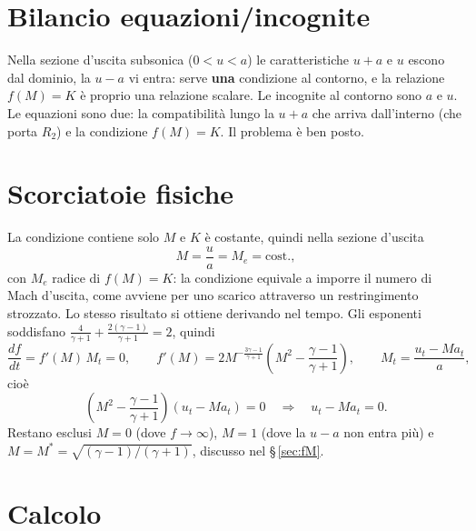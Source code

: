 \documentclass[11pt,a4paper]{article}
\newcommand{\uma}{u-a}
\newcommand{\upa}{u+a}
\newcommand{\Rd}{R_2}
\newcommand{\Me}{M_e}
\newcommand{\Mst}{M^{*}}
\begin{document}
\section{Bilancio equazioni/incognite}
Nella sezione d'uscita subsonica ($0<u<a$) le caratteristiche $\upa$ e $u$ escono dal dominio, la $\uma$ vi
entra: serve \textbf{una} condizione al contorno, e la relazione $f(M)=K$ è proprio una relazione scalare.
Le incognite al contorno sono $a$ e $u$. Le equazioni sono due: la compatibilità lungo la $\upa$ che arriva
dall'interno (che porta $\Rd$) e la condizione $f(M)=K$. Il problema è ben posto.

\section{Scorciatoie fisiche}
La condizione contiene solo $M$ e $K$ è costante, quindi nella sezione d'uscita
\[
  M=\frac ua=\Me=\text{cost.},
\]
con $\Me$ radice di $f(M)=K$: la condizione equivale a imporre il numero di Mach d'uscita, come avviene per
uno scarico attraverso un restringimento strozzato. Lo stesso risultato si ottiene derivando nel tempo. Gli esponenti soddisfano $\frac{4}{\gamma+1}+\frac{2(\gamma-1)}{\gamma+1}=2$,
quindi
\[
  \frac{d f}{dt}=f'(M)\,M_t=0,\qquad
  f'(M)=2M^{-\frac{3\gamma-1}{\gamma+1}}\left(M^2-\frac{\gamma-1}{\gamma+1}\right),\qquad
  M_t=\frac{u_t-M a_t}{a},
\]
cioè
\[
  \left(M^2-\frac{\gamma-1}{\gamma+1}\right)\left(u_t-M a_t\right)=0
  \quad\Rightarrow\quad u_t-M a_t=0 .
\]
Restano esclusi $M=0$ (dove $f\to\infty$), $M=1$ (dove la $\uma$ non entra più) e
$M=\Mst=\sqrt{(\gamma-1)/(\gamma+1)}$, discusso nel \S\,\ref{sec:fM}.

\section{Calcolo}
\end{document}
